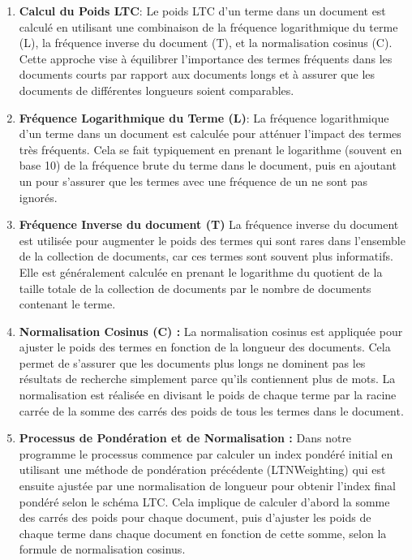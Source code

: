\documentclass[a4paper, 12pt]{article}
\begin{document}
\begin{enumerate}
\item{\textbf{Calcul du Poids LTC}}:  
Le poids LTC d'un terme dans un document est calculé en utilisant une combinaison de la fréquence logarithmique du terme (L), la fréquence inverse du document (T), et la normalisation cosinus (C). Cette approche vise à équilibrer l'importance des termes fréquents dans les documents courts par rapport aux documents longs et à assurer que les documents de différentes longueurs soient comparables.

\item{\textbf{Fréquence Logarithmique du Terme (L)}}: La fréquence logarithmique d'un terme dans un document est calculée pour atténuer l'impact des termes très fréquents. Cela se fait typiquement en prenant le logarithme (souvent en base 10) de la fréquence brute du terme dans le document, puis en ajoutant un pour s'assurer que les termes avec une fréquence de un ne sont pas ignorés.

\item{\textbf{Fréquence Inverse du document (T)}}
La fréquence inverse du document est utilisée pour augmenter le poids des termes qui sont rares dans l'ensemble de la collection de documents, car ces termes sont souvent plus informatifs. Elle est généralement calculée en prenant le logarithme du quotient de la taille totale de la collection de documents par le nombre de documents contenant le terme.

\item{\textbf{Normalisation Cosinus (C) :}} La normalisation cosinus est appliquée pour ajuster le poids des termes en fonction de la longueur des documents. Cela permet de s'assurer que les documents plus longs ne dominent pas les résultats de recherche simplement parce qu'ils contiennent plus de mots. La normalisation est réalisée en divisant le poids de chaque terme par la racine carrée de la somme des carrés des poids de tous les termes dans le document.

\item{\textbf{Processus de Pondération et de Normalisation :}}
Dans notre programme le processus commence par calculer un index pondéré initial en utilisant une méthode de pondération précédente (LTNWeighting) qui est ensuite ajustée par une normalisation de longueur pour obtenir l'index final pondéré selon le schéma LTC. Cela implique de calculer d'abord la somme des carrés des poids pour chaque document, puis d'ajuster les poids de chaque terme dans chaque document en fonction de cette somme, selon la formule de normalisation cosinus.

\end{enumerate} 
\end{document}
